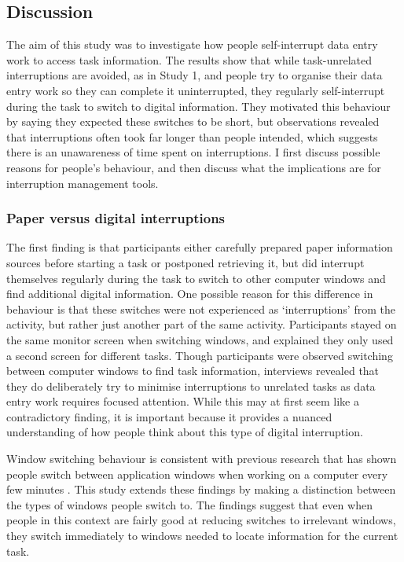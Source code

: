 \subsection{Discussion}
The aim of this study was to investigate how people self-interrupt data entry work to access task information. The results show that while task-unrelated interruptions are avoided, as in Study 1, and people try to organise their data entry work so they can complete it uninterrupted, they regularly self-interrupt during the task to switch to digital information. They motivated this behaviour by saying they expected these switches to be short, but observations revealed that interruptions often took far longer than people intended, which suggests there is an unawareness of time spent on interruptions. I first discuss possible reasons for people's behaviour, and then discuss what the implications are for interruption management tools. 

\subsubsection{Paper versus digital interruptions}
The first finding is that participants either carefully prepared paper information sources before starting a task or postponed retrieving it, but did interrupt themselves regularly during the task to switch to other computer windows and find additional digital information. One possible reason for this difference in behaviour is that these switches were not experienced as ‘interruptions’ from the activity, but rather just another part of the same activity. Participants stayed on the same monitor screen when switching windows, and explained they only used a second screen for different tasks. Though participants were observed switching between computer windows to find task information, interviews revealed that they do deliberately try to minimise interruptions to unrelated tasks as data entry work requires focused attention. While this may at first seem like a contradictory finding, it is important because it provides a nuanced understanding of how people think about this type of digital interruption. 

Window switching behaviour is consistent with previous research that has shown people switch between application windows when working on a computer every few minutes \citep{Gonzalez2004}. This study extends these findings by making a distinction between the types of windows people switch to. The findings suggest that even when people in this context are fairly good at reducing switches to irrelevant windows, they switch immediately to windows needed to locate information for the current task. 

